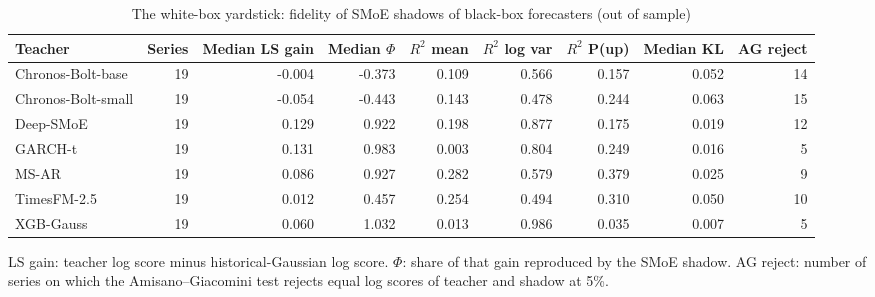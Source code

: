 \begin{table}[!htbp]\centering\scriptsize
\caption{The white-box yardstick: fidelity of SMoE shadows of black-box forecasters (out of sample)}\label{tab:yardstick}
\begin{adjustbox}{max width=\textwidth}
\begin{tabular}{lrrrrrrrr}
\toprule
Teacher & Series & Median LS gain & Median $\Phi$ & $R^2$ mean & $R^2$ log var & $R^2$ P(up) & Median KL & AG reject\\
\midrule
Chronos-Bolt-base & 19 & -0.004 & -0.373 & 0.109 & 0.566 & 0.157 & 0.052 & 14\\
Chronos-Bolt-small & 19 & -0.054 & -0.443 & 0.143 & 0.478 & 0.244 & 0.063 & 15\\
Deep-SMoE & 19 & 0.129 & 0.922 & 0.198 & 0.877 & 0.175 & 0.019 & 12\\
GARCH-t & 19 & 0.131 & 0.983 & 0.003 & 0.804 & 0.249 & 0.016 & 5\\
MS-AR & 19 & 0.086 & 0.927 & 0.282 & 0.579 & 0.379 & 0.025 & 9\\
TimesFM-2.5 & 19 & 0.012 & 0.457 & 0.254 & 0.494 & 0.310 & 0.050 & 10\\
XGB-Gauss & 19 & 0.060 & 1.032 & 0.013 & 0.986 & 0.035 & 0.007 & 5\\
\bottomrule
\end{tabular}
\end{adjustbox}
\par\smallskip\begin{minipage}{\textwidth}\footnotesize
LS gain: teacher log score minus historical-Gaussian log score. $\Phi$: share of that gain reproduced by the SMoE shadow. AG reject: number of series on which the Amisano--Giacomini test rejects equal log scores of teacher and shadow at 5\%.
\end{minipage}
\end{table}
